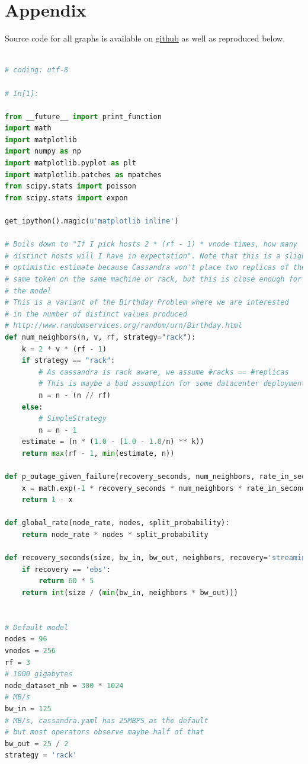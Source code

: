 \documentclass{article}
\begin{document}
\section{Appendix}

Source code for all graphs is available on \href{https://github.com/jolynch/python_performance_toolkit/blob/master/notebooks/cassandra_availability/cassandra_availability.ipynb}{github} as well as reproduced below.
\begin{lstlisting}[language=Python]

# coding: utf-8

# In[1]:

from __future__ import print_function
import math
import matplotlib
import numpy as np
import matplotlib.pyplot as plt
import matplotlib.patches as mpatches
from scipy.stats import poisson
from scipy.stats import expon

get_ipython().magic(u'matplotlib inline')

# Boils down to "If I pick hosts 2 * (rf - 1) * vnode times, how many
# distinct hosts will I have in expectation". Note that this is a slightly
# optimistic estimate because Cassandra won't place two replicas of the
# same token on the same machine or rack, but this is close enough for
# the model
# This is a variant of the Birthday Problem where we are interested
# in the number of distinct values produced
# http://www.randomservices.org/random/urn/Birthday.html
def num_neighbors(n, v, rf, strategy="rack"):
    k = 2 * v * (rf - 1)
    if strategy == "rack":
        # As cassandra is rack aware, we assume #racks == #replicas
        # This is maybe a bad assumption for some datacenter deployments
        n = n - (n // rf)
    else:
        # SimpleStrategy
        n = n - 1
    estimate = (n * (1.0 - (1.0 - 1.0/n) ** k))
    return max(rf - 1, min(estimate, n))

def p_outage_given_failure(recovery_seconds, num_neighbors, rate_in_seconds):
    x = math.exp(-1 * recovery_seconds * num_neighbors * rate_in_seconds)
    return 1 - x

def global_rate(node_rate, nodes, split_probability):
    return node_rate * nodes * split_probability

def recovery_seconds(size, bw_in, bw_out, neighbors, recovery='streaming'):
    if recovery == 'ebs':
        return 60 * 5
    return int(size / (min(bw_in, neighbors * bw_out)))


# Default model
nodes = 96
vnodes = 256
rf = 3
# 1000 gigabytes
node_dataset_mb = 300 * 1024
# MB/s
bw_in = 125
# MB/s, cassandra.yaml has 25MBPS as the default
# but most operators observe maybe half of that
bw_out = 25 / 2
strategy = 'rack'


\end{lstlisting}
\end{document}
